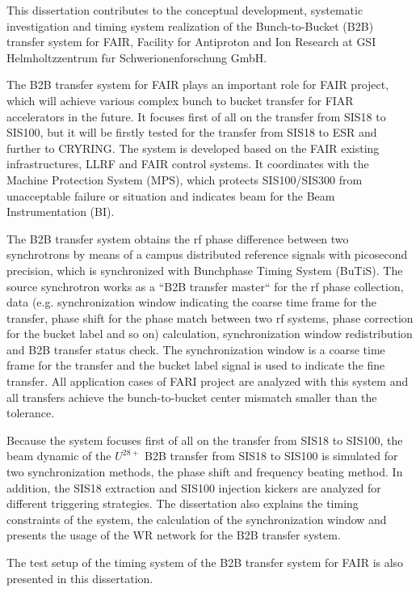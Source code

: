 This dissertation contributes to the conceptual development, systematic investigation and timing system realization of the Bunch-to-Bucket (B2B) transfer system for FAIR, Facility for Antiproton and Ion Research at GSI Helmholtzzentrum f$\ddot{u}$r Schwerionenforschung GmbH. 

The B2B transfer system for FAIR plays an important role for FAIR project, which will achieve various complex bunch to bucket transfer for FIAR accelerators in the future. It focuses first of all on the transfer from SIS18 to SIS100, but it will be firstly tested for the transfer from SIS18 to ESR and further to CRYRING. The system is developed based on the FAIR existing infrastructures, LLRF and FAIR control systems. It coordinates with the Machine Protection System (MPS), which protects SIS100/SIS300 from unacceptable failure or situation and indicates beam for the Beam Instrumentation (BI). 
 
The B2B transfer system obtains the rf phase difference between two synchrotrons by means of a campus distributed reference signals with picosecond precision, which is synchronized with Bunchphase Timing System (BuTiS). The source synchrotron works as a ``B2B transfer master`` for the rf phase collection, data (e.g. synchronization window indicating the coarse time frame for the transfer, phase shift for the phase match between two rf systems, phase correction for the bucket label and so on) calculation, synchronization window redistribution and B2B transfer status check. The synchronization window is a coarse time frame for the transfer and the bucket label signal is used to indicate the fine transfer. All application cases of FARI project are analyzed with this system and all transfers achieve the bunch-to-bucket center mismatch smaller than the tolerance.

Because the system focuses first of all on the transfer from SIS18 to SIS100, the beam dynamic of the $U^{28+}$ B2B transfer from SIS18 to SIS100 is simulated for two synchronization methods, the phase shift and frequency beating method. In addition, the SIS18 extraction and SIS100 injection kickers are analyzed for different triggering strategies. The dissertation also explains the timing constraints of the system, the calculation of the synchronization window and presents the usage of the WR network for the B2B transfer system. 

The test setup of the timing system of the B2B transfer system for FAIR is also presented in this dissertation. 
